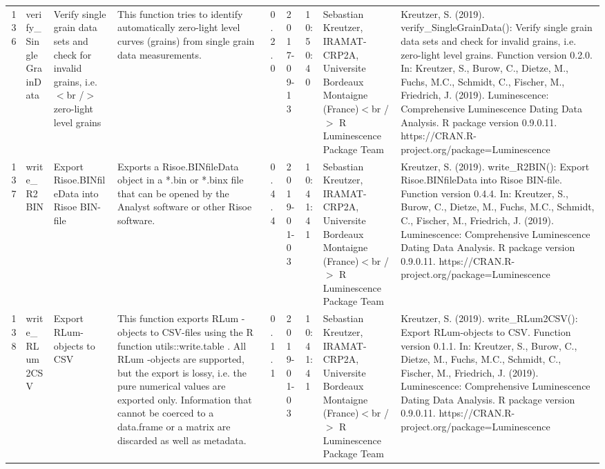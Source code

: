 \begin{table}[ht]
\begin{tabular}{rllllllll}
 \\ 
  136 & verify\_SingleGrainData & Verify single grain data sets and check for invalid grains, i.e.$<$br /$>$ zero-light level grains & This function tries to identify automatically zero-light level curves (grains) from single grain data measurements. & 0.2.0 & 2017-09-13 & 10:50:40
 & Sebastian Kreutzer, IRAMAT-CRP2A, Universite Bordeaux Montaigne (France)$<$br /$>$  R Luminescence Package Team & Kreutzer, S. (2019). verify\_SingleGrainData(): Verify single grain data sets and check for invalid grains, i.e. zero-light level grains. Function version 0.2.0. In: Kreutzer, S., Burow, C., Dietze, M., Fuchs, M.C., Schmidt, C., Fischer, M., Friedrich, J. (2019). Luminescence: Comprehensive Luminescence Dating Data Analysis. R package version 0.9.0.11. https://CRAN.R-project.org/package=Luminescence
 \\ 
  137 & write\_R2BIN & Export Risoe.BINfileData into Risoe BIN-file & Exports a Risoe.BINfileData object in a *.bin or *.binx file that can be opened by the Analyst software or other Risoe software. & 0.4.4 & 2019-01-03 & 10:41:41
 & Sebastian Kreutzer, IRAMAT-CRP2A, Universite Bordeaux Montaigne (France)$<$br /$>$  R Luminescence Package Team & Kreutzer, S. (2019). write\_R2BIN(): Export Risoe.BINfileData into Risoe BIN-file. Function version 0.4.4. In: Kreutzer, S., Burow, C., Dietze, M., Fuchs, M.C., Schmidt, C., Fischer, M., Friedrich, J. (2019). Luminescence: Comprehensive Luminescence Dating Data Analysis. R package version 0.9.0.11. https://CRAN.R-project.org/package=Luminescence
 \\ 
  138 & write\_RLum2CSV & Export RLum-objects to CSV & This function exports  RLum -objects to CSV-files using the R function utils::write.table . All  RLum -objects are supported, but the export is lossy, i.e. the pure numerical values are exported only. Information that cannot be coerced to a  data.frame  or a  matrix  are discarded as well as metadata. & 0.1.1 & 2019-01-03 & 10:41:41
 & Sebastian Kreutzer, IRAMAT-CRP2A, Universite Bordeaux Montaigne (France)$<$br /$>$  R Luminescence Package Team & Kreutzer, S. (2019). write\_RLum2CSV(): Export RLum-objects to CSV. Function version 0.1.1. In: Kreutzer, S., Burow, C., Dietze, M., Fuchs, M.C., Schmidt, C., Fischer, M., Friedrich, J. (2019). Luminescence: Comprehensive Luminescence Dating Data Analysis. R package version 0.9.0.11. https://CRAN.R-project.org/package=Luminescence
 \\ 
   \hline
\end{tabular}
\end{table}


